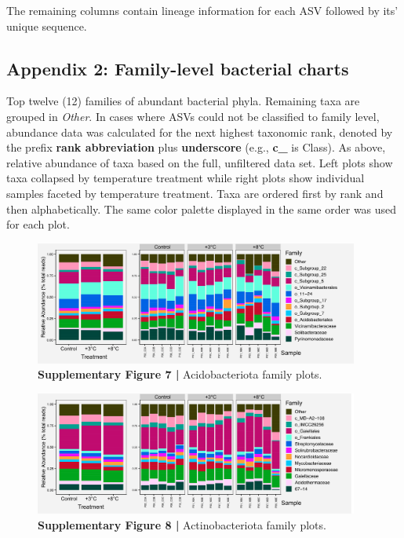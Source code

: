 \documentclass[
  10pt,
  letterpaper,
  DIV=11,
  numbers=noendperiod]{scrartcl}
\begin{document}
The remaining columns contain lineage information for each ASV followed
by its' unique sequence.

\newpage{}

\hypertarget{appendix-2}{%
\subsection{Appendix 2: Family-level bacterial
charts}\label{appendix-2}}

Top twelve (12) families of abundant bacterial phyla. Remaining taxa are
grouped in \emph{Other}. In cases where ASVs could not be classified to
family level, abundance data was calculated for the next highest
taxonomic rank, denoted by the prefix \textbf{rank abbreviation} plus
\textbf{underscore} (e.g., \textbf{c\_} is Class). As above, relative
abundance of taxa based on the full, unfiltered data set. Left plots
show taxa collapsed by temperature treatment while right plots show
individual samples faceted by temperature treatment. Taxa are ordered
first by rank and then alphabetically. The same color palette displayed
in the same order was used for each plot.

\begin{figure}

{\centering \includegraphics[width=0.95\textwidth,height=\textheight]{FIGURES/taxa_plots_class_Acido.png}

}

\caption{\textbf{Supplementary Figure 7 |} Acidobacteriota family
plots.}

\end{figure}

\begin{figure}

{\centering \includegraphics[width=0.95\textwidth,height=\textheight]{FIGURES/taxa_plots_class_Actino.png}

}

\caption{\textbf{Supplementary Figure 8 |} Actinobacteriota family
plots.}

\end{figure}
\end{document}
